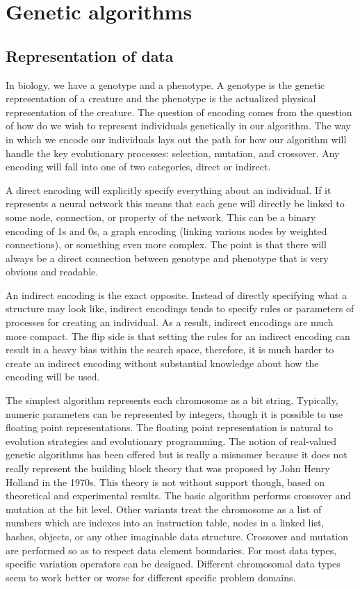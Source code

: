 \section{Genetic algorithms}

\subsection{Representation of data}
In biology, we have a genotype and a phenotype.
A genotype is the genetic representation of a creature and the phenotype is the actualized physical
representation of the creature. 
The question of encoding comes from the question of how do we wish to represent individuals 
genetically in our algorithm.
The way in which we encode our individuals lays out the path for how our algorithm will handle 
the key evolutionary processes: selection, mutation, and crossover.
Any encoding will fall into one of two categories, direct or indirect.

A direct encoding will explicitly specify everything about an individual.
If it represents a neural network this means that each gene will directly be linked to some node,
connection, or property of the network.
This can be a binary encoding of 1s and 0s, a graph encoding (linking various nodes by weighted
connections), or something even more complex.
The point is that there will always be a direct connection between genotype and phenotype that
is very obvious and readable.

An indirect encoding is the exact opposite. Instead of directly specifying what a structure may
look like, indirect encodings tends to specify rules or parameters of processes for creating an
individual.
As a result, indirect encodings are much more compact. The flip side is that setting the rules for
an indirect encoding can result in a heavy bias within the search space, therefore, it is much
harder to create an indirect encoding without substantial knowledge about how the 
encoding will be used.

The simplest algorithm represents each chromosome as a bit string.
Typically, numeric parameters can be represented by integers, though it is possible to use floating
point representations.
The floating point representation is natural to evolution strategies and evolutionary programming.
The notion of real-valued genetic algorithms has been offered but is really a misnomer because it
does not really represent the building block theory that was proposed by John Henry Holland in
the 1970s.
This theory is not without support though, based on theoretical and experimental results.
The basic algorithm performs crossover and mutation at the bit level. 
Other variants treat the chromosome as a list of numbers which are indexes into an instruction
table, nodes in a linked list, hashes, objects, or any other imaginable data structure. 
Crossover and mutation are performed so as to respect data element boundaries.
For most data types, specific variation operators can be designed. Different chromosomal data types
seem to work better or worse for different specific problem domains.


